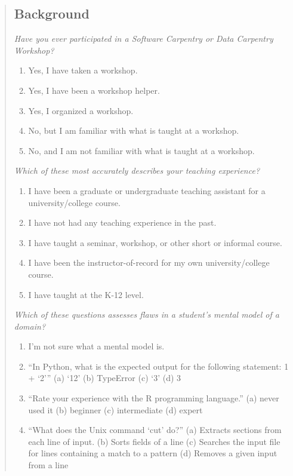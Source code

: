\begin{quotation}   %
\subsection*{Background}

\emph{Have you ever participated in a Software Carpentry or Data Carpentry Workshop?}

\begin{enumerate}
\item Yes, I have taken a workshop.
\item Yes, I have been a workshop helper.
\item Yes, I organized a workshop.
\item No, but I am familiar with what is taught at a workshop.
\item No, and I am not familiar with what is taught at a workshop.
\end{enumerate}

\emph{Which of these most accurately describes your teaching experience?}

\begin{enumerate}
\item I have been a graduate or undergraduate teaching assistant for a university/college course.
\item I have not had any teaching experience in the past.
\item I have taught a seminar, workshop, or other short or informal course.
\item I have been the instructor-of-record for my own university/college course.
\item I have taught at the K-12 level.
\end{enumerate}

\emph{Which of these questions assesses flaws in a student's mental model of a domain?}

\begin{enumerate}
\item I'm not sure what a mental model is.
\item ``In Python, what is the expected output for the following statement: 1 + `2'{}''
 (a) `12'
 (b) TypeError
 (c) ‘3’
 (d) 3
\item ``Rate your experience with the R programming language.''
 (a) never used it
 (b) beginner
 (c) intermediate
 (d) expert
\item ``What does the Unix command `cut' do?''
 (a) Extracts sections from each line of input.
 (b) Sorts fields of a line
 (c) Searches the input file for lines containing a match to a pattern
 (d) Removes a given input from a line
\end{enumerate}
\end{quotation}   %

